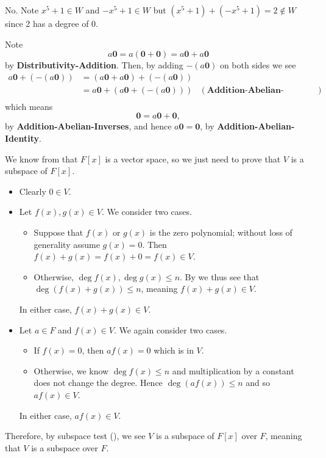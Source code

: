 \begin{questions}
    \item No. Note $x^5 + 1 \in W$ and $-x^5 + 1 \in W$ but $(x^5+1) + (-x^5+1) = 2 \notin W$ since 2 has a degree of 0.
    
    \item Note
    \[
        a\textbf{0} = a(\textbf{0} + \textbf{0}) = a\textbf{0} + a\textbf{0}
    \]
    by \textbf{Distributivity-Addition}. Then, by adding $-(a\textbf{0})$ on both sides we see
    \begin{align*}
        a\textbf{0} + (-(a\textbf{0})) &= (a\textbf{0} + a\textbf{0}) + (-(a\textbf{0}))\\
        &= a\textbf{0} + (a\textbf{0} + (-(a\textbf{0}))) & (\textbf{Addition-Abelian-Associativity})\\
    \end{align*}
    which means
    \[
        \textbf{0} = a\textbf{0} + \textbf{0},
    \]
    by \textbf{Addition-Abelian-Inverses}, and hence $a\textbf{0} = \textbf{0}$, by \textbf{Addition-Abelian-Identity}.

    \item We know from  that $F[x]$ is a vector space, so we just need to prove that $V$ is a subspace of $F[x]$.
    \begin{itemize}
        \item Clearly $0 \in V$.
        \item Let $f(x), g(x) \in V$. We consider two cases.
        \begin{itemize}
            \item Suppose that $f(x)$ or $g(x)$ is the zero polynomial; without loss of generality assume $g(x) = 0$. Then $f(x) + g(x) = f(x) + 0 = f(x) \in V$.
            \item Otherwise, $\deg f(x), \deg g(x) \leq n$. By  we thus see that $\deg (f(x) + g(x)) \leq n$, meaning $f(x) + g(x) \in V$.
        \end{itemize}
        In either case, $f(x) + g(x) \in V$.
        \item Let $a \in F$ and $f(x) \in V$. We again consider two cases.
        \begin{itemize}
            \item If $f(x) = 0$, then $af(x) = 0$ which is in $V$.
            \item Otherwise, we know $\deg f(x) \leq n$ and multiplication by a constant does not change the degree. Hence $\deg (af(x)) \leq n$ and so $af(x) \in V$.
        \end{itemize}
        In either case, $af(x) \in V$.
    \end{itemize}
    Therefore, by subspace test (), we see $V$ is a subspace of $F[x]$ over $F$, meaning that $V$ is a subspace over $F$.


\end{questions}
